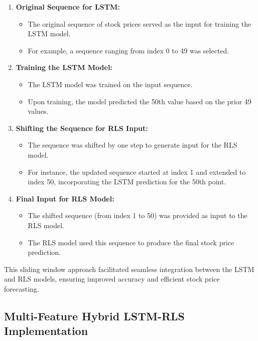 \begin{enumerate}
    \item \textbf{Original Sequence for LSTM:}
    \begin{itemize}
        \item The original sequence of stock prices served as the input for training the LSTM model.
        \item For example, a sequence ranging from index 0 to 49 was selected.
    \end{itemize}
    
    \item \textbf{Training the LSTM Model:}
    \begin{itemize}
        \item The LSTM model was trained on the input sequence.
        \item Upon training, the model predicted the 50th value based on the prior 49 values.
    \end{itemize}
    
    \item \textbf{Shifting the Sequence for RLS Input:}
    \begin{itemize}
        \item The sequence was shifted by one step to generate input for the RLS model.
        \item For instance, the updated sequence started at index 1 and extended to index 50, incorporating the LSTM prediction for the 50th point.
    \end{itemize}
    
    \item \textbf{Final Input for RLS Model:}
    \begin{itemize}
        \item The shifted sequence (from index 1 to 50) was provided as input to the RLS model.
        \item The RLS model used this sequence to produce the final stock price prediction.
    \end{itemize}
\end{enumerate}

This sliding window approach facilitated seamless integration between the LSTM and RLS models, ensuring improved accuracy and efficient stock price forecasting.

\subsection{Multi-Feature Hybrid LSTM-RLS Implementation}

